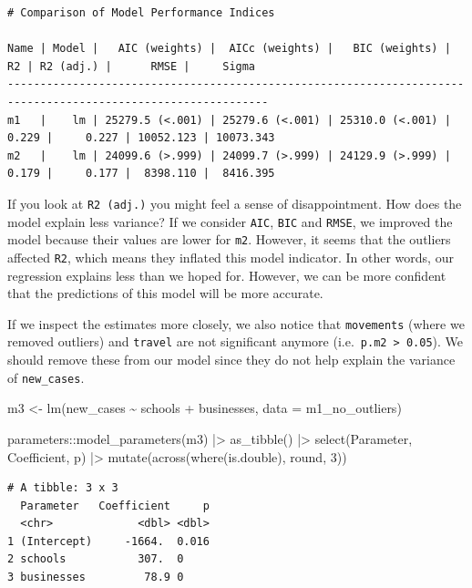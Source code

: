 \documentclass[
  letterpaper,
]{krantz}
\makeatletter
\newenvironment{Shaded}{\begin{snugshade}}{\end{snugshade}}
\newcommand{\AttributeTok}[1]{\textcolor[rgb]{0.40,0.45,0.13}{#1}}
\newcommand{\DecValTok}[1]{\textcolor[rgb]{0.68,0.00,0.00}{#1}}
\newcommand{\FunctionTok}[1]{\textcolor[rgb]{0.28,0.35,0.67}{#1}}
\newcommand{\NormalTok}[1]{\textcolor[rgb]{0.00,0.23,0.31}{#1}}
\newcommand{\OtherTok}[1]{\textcolor[rgb]{0.00,0.23,0.31}{#1}}
\newcommand{\SpecialCharTok}[1]{\textcolor[rgb]{0.37,0.37,0.37}{#1}}
\newenvironment{kframe}{%
\medskip{}
\setlength{\fboxsep}{.8em}
 \def\at@end@of@kframe{}%
 \ifinner\ifhmode%
  \def\at@end@of@kframe{\end{minipage}}%
  \begin{minipage}{\columnwidth}%
 \fi\fi%
 \def\FrameCommand##1{\hskip\@totalleftmargin \hskip-\fboxsep
 \colorbox{shadecolor}{##1}\hskip-\fboxsep
     \hskip-\linewidth \hskip-\@totalleftmargin \hskip\columnwidth}%
 \MakeFramed {\advance\hsize-\width
   \@totalleftmargin\z@ \linewidth\hsize
   \@setminipage}}%
 {\par\unskip\endMakeFramed%
 \at@end@of@kframe}
\renewenvironment{Shaded}{\begin{kframe}}{\end{kframe}}
\makeatother
\begin{document}
\begin{verbatim}
# Comparison of Model Performance Indices

Name | Model |   AIC (weights) |  AICc (weights) |   BIC (weights) |    R2 | R2 (adj.) |      RMSE |     Sigma
--------------------------------------------------------------------------------------------------------------
m1   |    lm | 25279.5 (<.001) | 25279.6 (<.001) | 25310.0 (<.001) | 0.229 |     0.227 | 10052.123 | 10073.343
m2   |    lm | 24099.6 (>.999) | 24099.7 (>.999) | 24129.9 (>.999) | 0.179 |     0.177 |  8398.110 |  8416.395
\end{verbatim}

If you look at \texttt{R2\ (adj.)} you might feel a sense of
disappointment. How does the model explain less variance? If we consider
\texttt{AIC}, \texttt{BIC} and \texttt{RMSE}, we improved the model
because their values are lower for \texttt{m2}. However, it seems that
the outliers affected \texttt{R2}, which means they inflated this model
indicator. In other words, our regression explains less than we hoped
for. However, we can be more confident that the predictions of this
model will be more accurate.

If we inspect the estimates more closely, we also notice that
\texttt{movements} (where we removed outliers) and \texttt{travel} are
not significant anymore (i.e.~\texttt{p.m2\ \textgreater{}\ 0.05}). We
should remove these from our model since they do not help explain the
variance of \texttt{new\_cases}.

\begin{Shaded}
\begin{Highlighting}[]
\NormalTok{m3 }\OtherTok{\textless{}{-}} \FunctionTok{lm}\NormalTok{(new\_cases }\SpecialCharTok{\textasciitilde{}}\NormalTok{ schools }\SpecialCharTok{+}\NormalTok{ businesses,}
         \AttributeTok{data =}\NormalTok{ m1\_no\_outliers)}

\NormalTok{parameters}\SpecialCharTok{::}\FunctionTok{model\_parameters}\NormalTok{(m3) }\SpecialCharTok{|\textgreater{}}
  \FunctionTok{as\_tibble}\NormalTok{() }\SpecialCharTok{|\textgreater{}}
  \FunctionTok{select}\NormalTok{(Parameter, Coefficient, p) }\SpecialCharTok{|\textgreater{}}
  \FunctionTok{mutate}\NormalTok{(}\FunctionTok{across}\NormalTok{(}\FunctionTok{where}\NormalTok{(is.double), round, }\DecValTok{3}\NormalTok{))}
\end{Highlighting}
\end{Shaded}

\begin{verbatim}
# A tibble: 3 x 3
  Parameter   Coefficient     p
  <chr>             <dbl> <dbl>
1 (Intercept)     -1664.  0.016
2 schools           307.  0    
3 businesses         78.9 0    
\end{verbatim}
\end{document}

